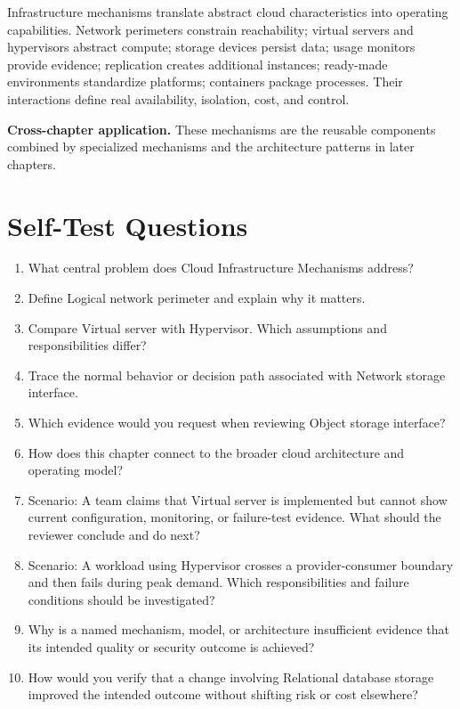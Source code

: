 \documentclass[11pt]{article}
\begin{document}
\begin{synthesisbox}
Infrastructure mechanisms translate abstract cloud characteristics into operating capabilities. Network perimeters constrain reachability; virtual servers and hypervisors abstract compute; storage devices persist data; usage monitors provide evidence; replication creates additional instances; ready-made environments standardize platforms; containers package processes. Their interactions define real availability, isolation, cost, and control.
\par\smallskip
\textbf{Cross-chapter application.} These mechanisms are the reusable components combined by specialized mechanisms and the architecture patterns in later chapters.
\end{synthesisbox}
\section{Self-Test Questions}
\begin{enumerate}
\item What central problem does Cloud Infrastructure Mechanisms address?
\item Define Logical network perimeter and explain why it matters.
\item Compare Virtual server with Hypervisor. Which assumptions and responsibilities differ?
\item Trace the normal behavior or decision path associated with Network storage interface.
\item Which evidence would you request when reviewing Object storage interface?
\item How does this chapter connect to the broader cloud architecture and operating model?
\item Scenario: A team claims that Virtual server is implemented but cannot show current configuration, monitoring, or failure-test evidence. What should the reviewer conclude and do next?
\item Scenario: A workload using Hypervisor crosses a provider-consumer boundary and then fails during peak demand. Which responsibilities and failure conditions should be investigated?
\item Why is a named mechanism, model, or architecture insufficient evidence that its intended quality or security outcome is achieved?
\item How would you verify that a change involving Relational database storage improved the intended outcome without shifting risk or cost elsewhere?
\end{enumerate}
\clearpage
\end{document}
